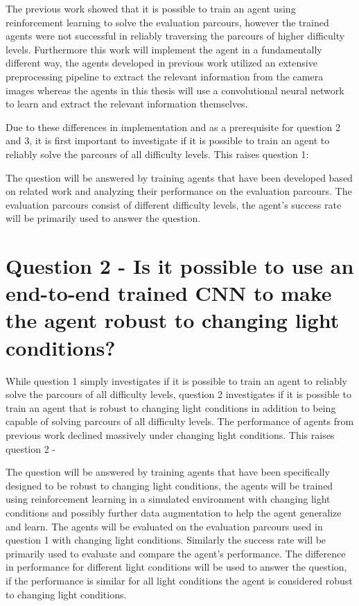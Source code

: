 The previous work \textcite{maximilian} showed that it is possible to train an agent using reinforcement learning to solve the evaluation parcours, however the trained agents were not successful in reliably traversing the parcours of higher difficulty levels. Furthermore this work will implement the agent in a fundamentally different way, the agents developed in previous work utilized an extensive preprocessing pipeline to extract the relevant information from the camera images whereas the agents in this thesis will use a convolutional neural network to learn and extract the relevant information themselves.

Due to these differences in implementation and as a prerequisite for question 2 and 3, it is first important to investigate if it is possible to train an agent to reliably solve the parcours of all difficulty levels. This raises question 1:
\questionOne

The question will be answered by training agents that have been developed based on related work and analyzing their performance on the evaluation parcours. The evaluation parcours consist of different difficulty levels, the agent's success rate will be primarily used to answer the question.


\section{Question 2 - Is it possible to use an end-to-end trained CNN to make the agent robust to changing light conditions?}

While question 1 simply investigates if it is possible to train an agent to reliably solve the parcours of all difficulty levels, question 2 investigates if it is possible to train an agent that is robust to changing light conditions in addition to being capable of solving parcours of all difficulty levels. The performance of agents from previous work \textcite{maximilian} declined massively under changing light conditions. This raises question 2 - \questionTwo

The question will be answered by training agents that have been specifically designed to be robust to changing light conditions, the agents will be trained using reinforcement learning in a simulated environment with changing light conditions and possibly further data augmentation to help the agent generalize and learn. The agents will be evaluated on the evaluation parcours used in question 1 with changing light conditions. Similarly the success rate will be primarily used to evaluate and compare the agent's performance. The difference in performance for different light conditions will be used to answer the question, if the performance is similar for all light conditions the agent is considered robust to changing light conditions.

